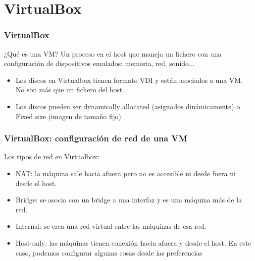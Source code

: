 \documentclass{beamer}
\begin{document}


\normalsize


\section{VirtualBox}
\begin{frame}
  \frametitle{VirtualBox}

  \begin{block}{¿Qué es una VM?}
Un proceso en el host que maneja un fichero con una configuración de dispositivos emulados: memoria, red, sonido...
  \end{block}

  \begin{itemize}
    \item Los discos en Virtualbox tienen formato VDI y están asociados a una VM. No son más que un fichero del host.
    \item Los discos pueden ser \alert{dynamically allocated} (asignados dinámicamente) o \alert{Fixed size} (imagen de tamaño fijo)
  \end{itemize}
\end{frame}

\begin{frame}
  \frametitle{VirtualBox: configuración de red de una VM}

Los tipos de red en Virtualbox:

  \begin{itemize}
    \item \alert{NAT:} la máquina sale hacia afuera pero no es accesible ni desde fuera ni desde el host.
    \item \alert{Bridge:} se asocia con un bridge a una interfaz y es una máquina más de la red.
    \item \alert{Internal:} se crea una red virtual entre las máquinas de esa red.
    \item \alert{Host-only:} las máquinas tienen conexión hacia afuera y desde el host.
     En este caso, podemos configurar algunas cosas desde las preferencias
  \end{itemize}
\end{frame}

\end{document}
